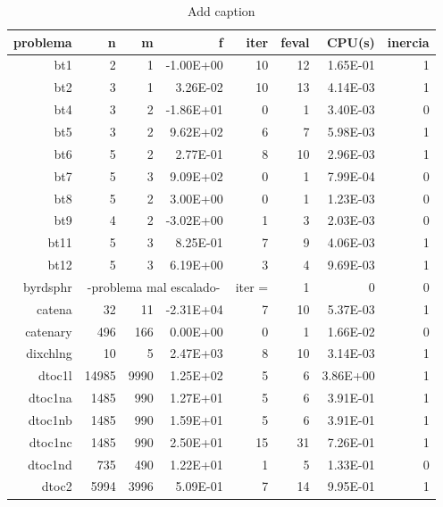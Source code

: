\begin{table}[htbp]
  \centering
  \caption{Add caption}
    \begin{tabular}{rrrrrrrr}
    \toprule
    \textbf{problema} & \textbf{n} & \textbf{m} & \textbf{f} & \textbf{iter} & \textbf{feval} & \textbf{CPU(s)} & \textbf{inercia} \\
    \midrule
    bt1   & 2     & 1     & -1.00E+00 & 10    & 12    & 1.65E-01 & 1 \\
    bt2   & 3     & 1     & 3.26E-02 & 10    & 13    & 4.14E-03 & 1 \\
    bt4   & 3     & 2     & -1.86E+01 & 0     & 1     & 3.40E-03 & 0 \\
    bt5   & 3     & 2     & 9.62E+02 & 6     & 7     & 5.98E-03 & 1 \\
    bt6   & 5     & 2     & 2.77E-01 & 8     & 10    & 2.96E-03 & 1 \\
    bt7   & 5     & 3     & 9.09E+02 & 0     & 1     & 7.99E-04 & 0 \\
    bt8   & 5     & 2     & 3.00E+00 & 0     & 1     & 1.23E-03 & 0 \\
    bt9   & 4     & 2     & -3.02E+00 & 1     & 3     & 2.03E-03 & 0 \\
    bt11  & 5     & 3     & 8.25E-01 & 7     & 9     & 4.06E-03 & 1 \\
    bt12  & 5     & 3     & 6.19E+00 & 3     & 4     & 9.69E-03 & 1 \\
    byrdsphr & \multicolumn{3}{c}{    -problema mal escalado-} & iter = & 1     & 0     & 0 \\
    catena & 32    & 11    & -2.31E+04 & 7     & 10    & 5.37E-03 & 1 \\
    catenary & 496   & 166   & 0.00E+00 & 0     & 1     & 1.66E-02 & 0 \\
    dixchlng & 10    & 5     & 2.47E+03 & 8     & 10    & 3.14E-03 & 1 \\
    dtoc1l & 14985 & 9990  & 1.25E+02 & 5     & 6     & 3.86E+00 & 1 \\
    dtoc1na & 1485  & 990   & 1.27E+01 & 5     & 6     & 3.91E-01 & 1 \\
    dtoc1nb & 1485  & 990   & 1.59E+01 & 5     & 6     & 3.91E-01 & 1 \\
    dtoc1nc & 1485  & 990   & 2.50E+01 & 15    & 31    & 7.26E-01 & 1 \\
    dtoc1nd & 735   & 490   & 1.22E+01 & 1     & 5     & 1.33E-01 & 0 \\
    dtoc2 & 5994  & 3996  & 5.09E-01 & 7     & 14    & 9.95E-01 & 1 \\

\end{tabular}
\end{table}
